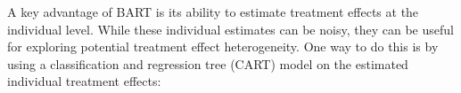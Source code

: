 \documentclass[
  letterpaper,
  DIV=11,
  numbers=noendperiod]{scrreprt}
\begin{document}
\begin{tcolorbox}[enhanced jigsaw, colframe=quarto-callout-note-color-frame, left=2mm, toprule=.15mm, colbacktitle=quarto-callout-note-color!10!white, title=\textcolor{quarto-callout-note-color}{\faInfo}\hspace{0.5em}{Tip}, coltitle=black, rightrule=.15mm, leftrule=.75mm, colback=white, arc=.35mm, bottomtitle=1mm, bottomrule=.15mm, breakable, titlerule=0mm, opacitybacktitle=0.6, toptitle=1mm, opacityback=0]

A key advantage of BART is its ability to estimate treatment effects at
the individual level. While these individual estimates can be noisy,
they can be useful for exploring potential treatment effect
heterogeneity. One way to do this is by using a classification and
regression tree (CART) model on the estimated individual treatment
effects:

\end{tcolorbox}
\end{document}
